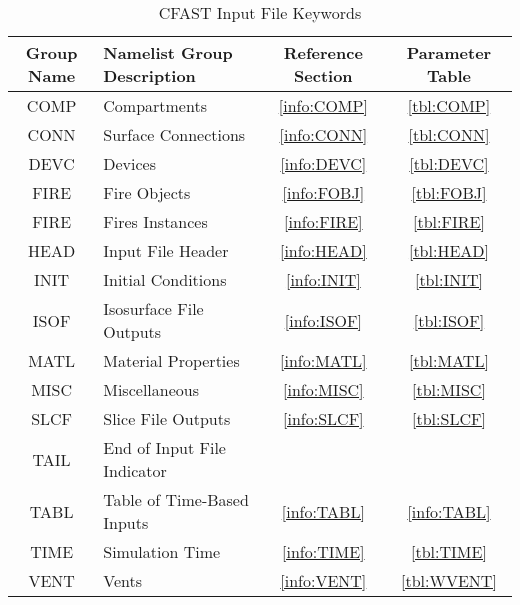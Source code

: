 \begin{table}[ht]
\begin{center}
\caption{CFAST Input File Keywords}
\label{tbl:namelistgroups}
\begin{tabular}{|c|l|c|c|}
\hline
Group Name   & Namelist Group Description     & Reference Section & Parameter Table  \\ \hline
{\ct COMP}   & Compartments                   & \ref{info:COMP}   & \ref{tbl:COMP}   \\ \hline
{\ct CONN}   & Surface Connections            & \ref{info:CONN}   & \ref{tbl:CONN}   \\ \hline
{\ct DEVC}   & Devices                        & \ref{info:DEVC}   & \ref{tbl:DEVC}   \\ \hline
{\ct FIRE}   & Fire Objects                   & \ref{info:FOBJ}   & \ref{tbl:FOBJ}   \\ \hline
{\ct FIRE}   & Fires Instances                & \ref{info:FIRE}   & \ref{tbl:FIRE}   \\ \hline
{\ct HEAD}   & Input File Header              & \ref{info:HEAD}   & \ref{tbl:HEAD}   \\ \hline
{\ct INIT}   & Initial Conditions             & \ref{info:INIT}   & \ref{tbl:INIT}   \\ \hline
{\ct ISOF}   & Isosurface File Outputs        & \ref{info:ISOF}   & \ref{tbl:ISOF}   \\ \hline
{\ct MATL}   & Material Properties            & \ref{info:MATL}   & \ref{tbl:MATL}   \\ \hline
{\ct MISC}   & Miscellaneous                  & \ref{info:MISC}   & \ref{tbl:MISC}   \\ \hline
{\ct SLCF}   & Slice File Outputs             & \ref{info:SLCF}   & \ref{tbl:SLCF}   \\ \hline
{\ct TAIL}   & End of Input File Indicator    &                   &                  \\ \hline
{\ct TABL}   & Table of Time-Based Inputs     & \ref{info:TABL}   & \ref{info:TABL}   \\ \hline
{\ct TIME}   & Simulation Time                & \ref{info:TIME}   & \ref{tbl:TIME}   \\ \hline
{\ct VENT}   & Vents                          & \ref{info:VENT}   & \ref{tbl:WVENT}   \\ \hline
\end{tabular}
\end{center}
\end{table}

